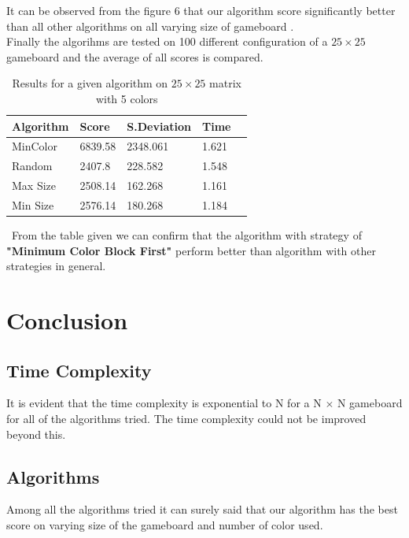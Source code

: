 \documentclass[twoside]{article}
\begin{document}
\begin{multicols}{2}
It can be observed from the figure 6 that our algorithm score significantly better than all other algorithms on all varying size of gameboard .\\
Finally the algorihms are tested on 100 different configuration of a $25 \times 25$ gameboard and the average of all scores is compared.
\begin{table}[H]
\caption{Results for a given algorithm on $25\times25$ matrix with 5 colors}
\centering
\begin{tabular}{llllr}
\toprule
\cmidrule(r){1-4}
Algorithm & Score & S.Deviation & Time \\
\midrule
MinColor & 6839.58 & 2348.061 & 1.621\\
Random & 2407.8 & 228.582 & 1.548\\
Max Size & 2508.14 & 162.268 & 1.161\\
Min Size & 2576.14 & 180.268 & 1.184\\
\bottomrule
\end{tabular}
\end{table}\
From the table given we can confirm that the algorithm  with strategy of \textbf{"Minimum Color Block First"} perform better than algorithm with other strategies in general.\\





\section{Conclusion}

\subsection{Time Complexity}
It is evident that the time complexity is exponential to N for a N $\times $ N gameboard for all of the algorithms tried. The time complexity could not be improved beyond this.

\subsection{Algorithms}
Among all the algorithms tried it can surely said that our algorithm has the best score on varying size of the gameboard and number of color used.



\end{multicols}
\end{document}
